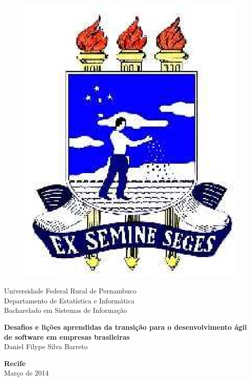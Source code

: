 \begin{figure}[h]
\leavevmode
\begin{minipage}{\textwidth}
\includegraphics[scale=0.3]{prefacios/capa/logo_ufrpe01.eps}
\end{minipage}
\end{figure}
\vspace*{-3.5cm}


{\bf
\begin{center}
{\large
\hspace*{0cm}Universidade Federal Rural de Pernambuco} \\
\hspace*{0cm}Departamento de Estatística e Informática\\
\hspace*{0cm}Bacharelado em Sistemas de Informação\\
\end{center}}
\vspace{5.0cm}
\noindent
\begin{center}
{\Large \bf Desafios e lições aprendidas da transição para o desenvolvimento ágil de software em empresas brasileiras
} \\[5cm]
{\Large  Daniel Filype Silva Barreto}\\[6mm]
\end{center}


\vspace{5.0cm}
\begin{center}
{\large {\bf Recife}\\[6mm]
Março de 2014}
\end{center}
\newpage
